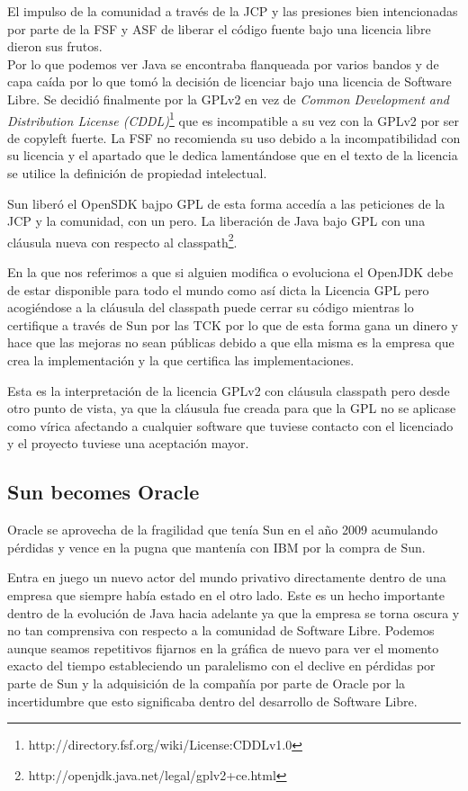 \documentclass[11pt]{scrartcl}
\begin{document}
El impulso de la comunidad a través de la JCP y las presiones bien intencionadas por parte de la FSF y ASF de liberar el código fuente bajo una licencia libre dieron sus frutos.\\
Por lo que podemos ver Java se encontraba flanqueada por varios bandos y de capa caída por lo que tomó la decisión de licenciar bajo una licencia de Software Libre. Se decidió finalmente por la GPLv2 en vez de \emph{Common Development and Distribution License (CDDL)}\footnote{http://directory.fsf.org/wiki/License:CDDLv1.0} que es incompatible a su vez con la GPLv2 por ser de copyleft fuerte. La FSF no recomienda su uso debido a la incompatibilidad con su licencia y el apartado que le dedica lamentándose que en el texto de la licencia se utilice la definición de propiedad intelectual.

Sun liberó el OpenSDK bajpo GPL de esta forma accedía a las peticiones de la JCP y la comunidad, con un pero. La liberación de Java bajo GPL con una cláusula nueva con respecto al classpath\footnote{http://openjdk.java.net/legal/gplv2+ce.html}.

En la que nos referimos a que si alguien modifica o evoluciona el OpenJDK debe de estar disponible para todo el mundo como así dicta la Licencia GPL pero acogiéndose a la cláusula del classpath puede cerrar su código mientras lo certifique a través de Sun por las TCK por lo que de esta forma gana un dinero y hace que las mejoras no sean públicas debido a que ella misma es la empresa que crea la implementación y la que certifica las implementaciones.

Esta es la interpretación de la licencia GPLv2 con cláusula classpath pero desde otro punto de vista, ya que la cláusula fue creada para que la GPL no se aplicase como vírica afectando a cualquier software que tuviese contacto con el licenciado y el proyecto tuviese una aceptación mayor.

\subsection{Sun becomes Oracle}

Oracle se aprovecha de la fragilidad que tenía Sun en el año 2009 acumulando pérdidas y vence en la pugna que mantenía con IBM por la compra de Sun.

Entra en juego un nuevo actor del mundo privativo directamente dentro de una empresa que siempre había estado en el otro lado. Este es un hecho importante dentro de la evolución de Java hacia adelante ya que la empresa se torna oscura y no tan comprensiva con respecto a la comunidad de Software Libre. Podemos aunque seamos repetitivos fijarnos en la gráfica de nuevo para ver el momento exacto del tiempo estableciendo un paralelismo con el declive en pérdidas por parte de Sun y la adquisición de la compañía por parte de Oracle por la incertidumbre que esto significaba dentro del desarrollo de Software Libre.
\end{document}
